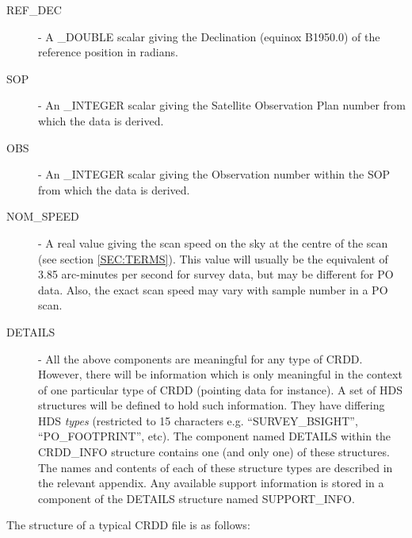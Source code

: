 \begin {description}
\item [REF\_DEC] - A \_DOUBLE scalar giving the Declination (equinox B1950.0) 
of the reference position in radians.

\item [SOP] - An \_INTEGER scalar giving the Satellite Observation Plan number 
from which the data is derived.

\item [OBS] - An \_INTEGER scalar giving the Observation number within the
SOP from which the data is derived.

\item [NOM\_SPEED] - A real value giving the scan speed on the sky at the 
centre of the scan (see section \ref {SEC:TERMS}). This value will usually
be the equivalent of 3.85 arc-minutes per second for survey data, but may be
different for PO data. Also, the exact scan speed may vary with sample number
in a PO scan. 

\item [DETAILS] - All the above components are meaningful for any type of CRDD.
However, there will be information which is only meaningful in the context of
one particular type of CRDD (pointing data for instance). A set of HDS
structures will be defined to hold such information. They have differing HDS
{\em types} (restricted to 15 characters e.g. ``SURVEY\_BSIGHT'',
``PO\_FOOTPRINT'', etc). The component named DETAILS within the CRDD\_INFO
structure contains one (and only one) of these structures. The names and
contents of each of these structure types are described in the relevant
appendix. Any available support information is stored in a component of the 
DETAILS structure named SUPPORT\_INFO.

\end {description}
\newpage

The structure of a typical CRDD file is as follows:

